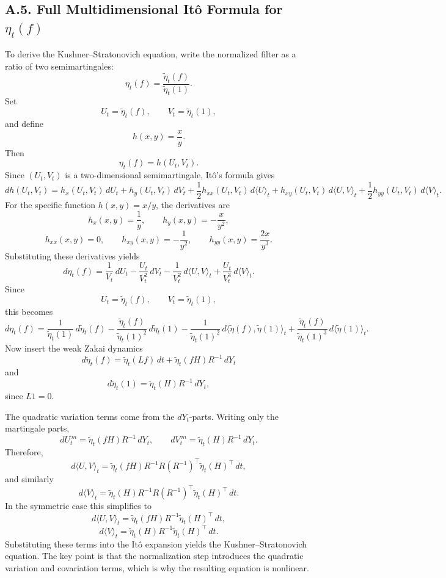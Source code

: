 \documentclass[11pt]{article}
\theoremstyle{definition}
\theoremstyle{remark}
\begin{document}
\subsection*{A.5. Full Multidimensional It\^o Formula for $\eta_t(f)$}
To derive the Kushner--Stratonovich equation, write the normalized filter as a ratio of two semimartingales:
\[
\eta_t(f)=\frac{\tilde \eta_t(f)}{\tilde \eta_t(1)}.
\]
Set
\[
U_t=\tilde \eta_t(f),
\qquad
V_t=\tilde \eta_t(1),
\]
and define
\[
h(x,y)=\frac{x}{y}.
\]
Then
\[
\eta_t(f)=h(U_t,V_t).
\]
Since $(U_t,V_t)$ is a two-dimensional semimartingale, It\^o's formula gives
\[
dh(U_t,V_t)
=
h_x(U_t,V_t)\,dU_t
+
h_y(U_t,V_t)\,dV_t
+
\frac12 h_{xx}(U_t,V_t)\,d\langle U\rangle_t
+
h_{xy}(U_t,V_t)\,d\langle U,V\rangle_t
+
\frac12 h_{yy}(U_t,V_t)\,d\langle V\rangle_t.
\]
For the specific function $h(x,y)=x/y$, the derivatives are
\[
h_x(x,y)=\frac1y,
\qquad
h_y(x,y)=-\frac{x}{y^2},
\]
\[
h_{xx}(x,y)=0,
\qquad
h_{xy}(x,y)=-\frac1{y^2},
\qquad
h_{yy}(x,y)=\frac{2x}{y^3}.
\]
Substituting these derivatives yields
\[
d\eta_t(f)
=
\frac{1}{V_t}\,dU_t
-\frac{U_t}{V_t^2}\,dV_t
-\frac{1}{V_t^2}\,d\langle U,V\rangle_t
+\frac{U_t}{V_t^3}\,d\langle V\rangle_t.
\]
Since
\[
U_t=\tilde \eta_t(f),
\qquad
V_t=\tilde \eta_t(1),
\]
this becomes
\[
d\eta_t(f)
=
\frac{1}{\tilde \eta_t(1)}\,d\tilde \eta_t(f)
-\frac{\tilde \eta_t(f)}{\tilde \eta_t(1)^2}\,d\tilde \eta_t(1)
-\frac{1}{\tilde \eta_t(1)^2}\,d\langle \tilde \eta(f),\tilde \eta(1)\rangle_t
+\frac{\tilde \eta_t(f)}{\tilde \eta_t(1)^3}\,d\langle \tilde \eta(1)\rangle_t.
\]
Now insert the weak Zakai dynamics
\[
d\tilde \eta_t(f)=\tilde \eta_t(Lf)\,dt+\tilde \eta_t(fH)R^{-1}\,dY_t
\]
and
\[
d\tilde \eta_t(1)=\tilde \eta_t(H)R^{-1}\,dY_t,
\]
since $L1=0$.

The quadratic variation terms come from the $dY_t$-parts. Writing only the martingale parts,
\[
dU_t^{\,m}=\tilde \eta_t(fH)R^{-1}\,dY_t,
\qquad
dV_t^{\,m}=\tilde \eta_t(H)R^{-1}\,dY_t.
\]
Therefore,
\[
d\langle U,V\rangle_t
=
\tilde \eta_t(fH)R^{-1}R(R^{-1})^\top \tilde \eta_t(H)^\top\,dt,
\]
and similarly
\[
d\langle V\rangle_t
=
\tilde \eta_t(H)R^{-1}R(R^{-1})^\top \tilde \eta_t(H)^\top\,dt.
\]
In the symmetric case this simplifies to
\[
d\langle U,V\rangle_t
=
\tilde \eta_t(fH)R^{-1}\tilde \eta_t(H)^\top\,dt,
\]
\[
d\langle V\rangle_t
=
\tilde \eta_t(H)R^{-1}\tilde \eta_t(H)^\top\,dt.
\]
Substituting these terms into the It\^o expansion yields the Kushner--Stratonovich equation. The key point is that the normalization step introduces the quadratic variation and covariation terms, which is why the resulting equation is nonlinear.
\end{document}
